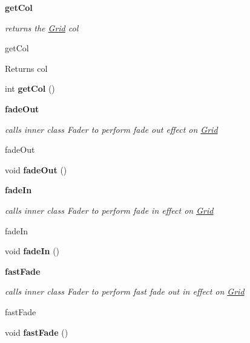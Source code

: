 \begin{Indent}{\bf get\+Col}\par
{\em returns the \hyperlink{classbattleship_1_1gameboard_1_1Grid}{Grid} col

get\+Col

\begin{DoxyReturn}{Returns}
col 
\end{DoxyReturn}
}\begin{DoxyCompactItemize}
\item 
\hypertarget{classbattleship_1_1gameboard_1_1Grid_a38754aae6c0f4c31ce20c40dc3033438}{}int {\bfseries get\+Col} ()\label{classbattleship_1_1gameboard_1_1Grid_a38754aae6c0f4c31ce20c40dc3033438}

\end{DoxyCompactItemize}
\end{Indent}
\begin{Indent}{\bf fade\+Out}\par
{\em calls inner class Fader to perform fade out effect on \hyperlink{classbattleship_1_1gameboard_1_1Grid}{Grid}

fade\+Out }\begin{DoxyCompactItemize}
\item 
\hypertarget{classbattleship_1_1gameboard_1_1Grid_a7efaa413a41c6804bd9ef6bf142bfb8c}{}void {\bfseries fade\+Out} ()\label{classbattleship_1_1gameboard_1_1Grid_a7efaa413a41c6804bd9ef6bf142bfb8c}

\end{DoxyCompactItemize}
\end{Indent}
\begin{Indent}{\bf fade\+In}\par
{\em calls inner class Fader to perform fade in effect on \hyperlink{classbattleship_1_1gameboard_1_1Grid}{Grid}

fade\+In }\begin{DoxyCompactItemize}
\item 
\hypertarget{classbattleship_1_1gameboard_1_1Grid_afd3f3532aaac97fb627b8e9c684cb41b}{}void {\bfseries fade\+In} ()\label{classbattleship_1_1gameboard_1_1Grid_afd3f3532aaac97fb627b8e9c684cb41b}

\end{DoxyCompactItemize}
\end{Indent}
\begin{Indent}{\bf fast\+Fade}\par
{\em calls inner class Fader to perform fast fade out in effect on \hyperlink{classbattleship_1_1gameboard_1_1Grid}{Grid}

fast\+Fade }\begin{DoxyCompactItemize}
\item 
\hypertarget{classbattleship_1_1gameboard_1_1Grid_a3b702d570345963710b0b274ffbc6ce5}{}void {\bfseries fast\+Fade} ()\label{classbattleship_1_1gameboard_1_1Grid_a3b702d570345963710b0b274ffbc6ce5}

\end{DoxyCompactItemize}
\end{Indent}
